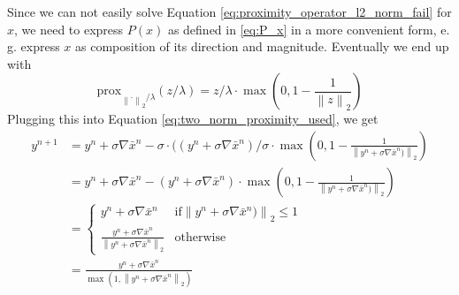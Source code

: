 \documentclass{paper}
\newcommand{\prox}{\text{prox}}
\newcommand{\twonorm}[1]{\left\lVert#1\right\rVert_2}
\begin{document}
Since we can not easily solve Equation \eqref{eq:proximity_operator_l2_norm_fail} for $x$, 
we need to express $P(x)$ as defined in \eqref{eq:P_x} in a more convenient form, e. g. express $x$ 
as composition of its direction and magnitude. 
Eventually we end up with
\begin{equation}
	\prox_{\twonorm{\cdot} / \lambda}(z / \lambda) =
	z / \lambda \cdot \max \left(0 , 1 - \frac{1}{\twonorm{z}} \right)
\end{equation}
Plugging this into Equation \eqref{eq:two_norm_proximity_used}, we get
\begin{align}
	y^{n+1} &= y^n + \sigma \nabla \bar{x}^n - 
			   \sigma \cdot ((y^n + \sigma \nabla \bar{x}^n) / \sigma \cdot
			   \max \left(0, 1 - \frac{1}{\twonorm{y^n + \sigma \nabla \bar{x}^n)}} \right) \\
			&= y^n + \sigma \nabla \bar{x}^n - 
			   (y^n + \sigma \nabla \bar{x}^n) \cdot
			   \max \left(0, 1 - \frac{1}{\twonorm{y^n + \sigma \nabla \bar{x}^n)}} \right) \\
			&= \begin{cases}
   				y^n + \sigma \nabla \bar{x}^n  			
   						& \text{if} \twonorm{y^n + \sigma \nabla \bar{x}^n)} \leq 1 \\
   				\frac{y^n + \sigma \nabla \bar{x}^n}
				    {\twonorm{y^n + \sigma \nabla \bar{x}^n}}      
				    		& \text{otherwise}
  			 \end{cases} \\
			&= \frac{y^n + \sigma \nabla \bar{x}^n}
				    {\max \left(1, \twonorm{y^n + \sigma \nabla \bar{x}^n}\right)}
\end{align}
\end{document}
